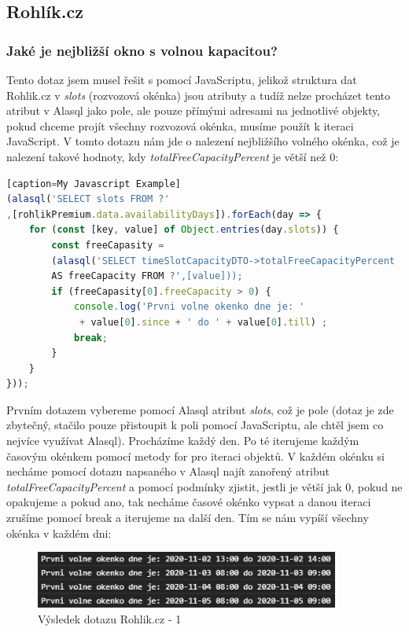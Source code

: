 \documentclass[a4, titlepage]{article}
\begin{document}
\subsection{Rohlík.cz}
\subsubsection{Jaké je nejbližší okno s volnou kapacitou?}
Tento dotaz jsem musel řešit s pomocí JavaScriptu, jelikož struktura dat Rohlik.cz v \textit{slots} (rozvozová okénka) jsou atributy a tudíž nelze procházet tento atribut v Alasql jako pole, ale pouze přímými adresami na jednotlivé objekty, pokud chceme projít všechny rozvozová okénka, musíme použít k iteraci JavaScript. V tomto dotazu nám jde o nalezení nejbližšího volného okénka, což je nalezení takové hodnoty, kdy \textit{totalFreeCapacityPercent} je větší než 0: 
\begin{lstlisting}[language=JavaScript][caption=My Javascript Example]
(alasql('SELECT slots FROM ?'
,[rohlikPremium.data.availabilityDays]).forEach(day => {
    for (const [key, value] of Object.entries(day.slots)) {
        const freeCapasity = 
        (alasql('SELECT timeSlotCapacityDTO->totalFreeCapacityPercent 
        AS freeCapacity FROM ?',[value]));
        if (freeCapasity[0].freeCapacity > 0) {
            console.log('Prvni volne okenko dne je: '
             + value[0].since + ' do ' + value[0].till) ;
            break;
        }
    }
}));
\end{lstlisting}
Prvním dotazem vybereme pomocí Alasql atribut \textit{slots}, což je pole (dotaz je zde zbytečný, stačilo pouze přistoupit k poli pomocí JavaScriptu, ale chtěl jsem co nejvíce využívat Alasql). Procházíme každý den. Po té iterujeme každým časovým okénkem pomocí metody for pro iteraci objektů. V každém okénku si necháme pomocí dotazu napsaného v Alasql najít zanořený atribut \textit{totalFreeCapacityPercent} a pomocí podmínky zjistit, jestli je větší jak 0, pokud ne opakujeme a pokud ano, tak necháme časové okénko vypsat a danou iteraci zrušíme pomocí break a iterujeme na další den. Tím se nám vypíší všechny okénka v každém dni:
\begin{figure}[h]
    \centering
    \includegraphics[width=10cm]{R1}
    \caption{Výsledek dotazu Rohlik.cz - 1}
\end{figure}
\newpage
\end{document}
